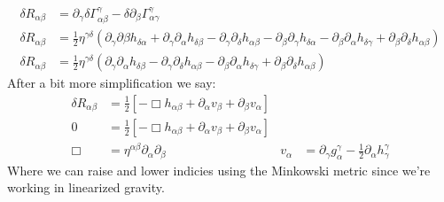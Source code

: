\begin{align*}
	\delta R_{\alpha\beta} &= \partial_\gamma \delta\Gamma^\gamma_{\alpha\beta} - \delta\partial_\beta \Gamma^\gamma_{\alpha\gamma} \\
	\delta R_{\alpha\beta} &= \frac{1}{2} \eta^{\gamma\delta} \left( \partial_\gamma\partial\beta h_{\delta\alpha} + \partial_\gamma\partial_\alpha h_{\delta\beta} - \partial_\gamma\partial_\delta h_{\alpha\beta} 
				-\partial_\beta\partial_\gamma h_{\delta\alpha} - \partial_\beta\partial_\alpha h_{\delta\gamma} + \partial_\beta\partial_\delta h_{\alpha\beta}\right) \\
	\delta R_{\alpha\beta} &= \frac{1}{2} \eta^{\gamma\delta} \left( \partial_\gamma\partial_\alpha h_{\delta\beta} - \partial_\gamma\partial_\delta h_{\alpha\beta} 
				 - \partial_\beta\partial_\alpha h_{\delta\gamma} + \partial_\beta\partial_\delta h_{\alpha\beta}\right)
\end{align*}
After a bit more simplification we say:
\begin{align*}
	\delta R_{\alpha\beta} &= \frac{1}{2}\left[ - \Box h_{\alpha\beta} + \partial_\alpha v_\beta + \partial_\beta v_\alpha\right] \\
	0 &= \frac{1}{2}\left[ - \Box h_{\alpha\beta} + \partial_\alpha v_\beta + \partial_\beta v_\alpha\right] \\
	\Box &= \eta^{\alpha\beta} \partial_\alpha\partial_\beta & v_\alpha &= \partial_\gamma g^\gamma_\alpha - \frac{1}{2}\partial_\alpha h^\gamma_\gamma
\end{align*}
Where we can raise and lower indicies using the Minkowski metric since we're working in linearized gravity.

